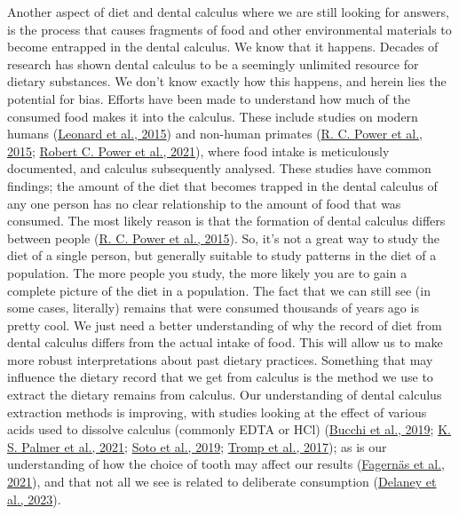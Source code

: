 \documentclass[
  letterpaper,
]{book}
\begin{document}
Another aspect of diet and dental calculus where we are still looking
for answers, is the process that causes fragments of food and other
environmental materials to become entrapped in the dental calculus. We
know that it happens. Decades of research has shown dental calculus to
be a seemingly unlimited resource for dietary substances. We don't know
exactly how this happens, and herein lies the potential for bias.
Efforts have been made to understand how much of the consumed food makes
it into the calculus. These include studies on modern humans
(\protect\hyperlink{ref-leonardPlantMicroremains2015}{Leonard et al.,
2015}) and non-human primates
(\protect\hyperlink{ref-powerChimpCalculus2015}{R. C. Power et al.,
2015}; \protect\hyperlink{ref-powerRepresentativenessDental2021}{Robert
C. Power et al., 2021}), where food intake is meticulously documented,
and calculus subsequently analysed. These studies have common findings;
the amount of the diet that becomes trapped in the dental calculus of
any one person has no clear relationship to the amount of food that was
consumed. The most likely reason is that the formation of dental
calculus differs between people
(\protect\hyperlink{ref-powerChimpCalculus2015}{R. C. Power et al.,
2015}). So, it's not a great way to study the diet of a single person,
but generally suitable to study patterns in the diet of a population.
The more people you study, the more likely you are to gain a complete
picture of the diet in a population. The fact that we can still see (in
some cases, literally) remains that were consumed thousands of years ago
is pretty cool. We just need a better understanding of why the record of
diet from dental calculus differs from the actual intake of food. This
will allow us to make more robust interpretations about past dietary
practices. Something that may influence the dietary record that we get
from calculus is the method we use to extract the dietary remains from
calculus. Our understanding of dental calculus extraction methods is
improving, with studies looking at the effect of various acids used to
dissolve calculus (commonly EDTA or HCl)
(\protect\hyperlink{ref-bucchiComparisonsMethods2019}{Bucchi et al.,
2019}; \protect\hyperlink{ref-palmerComparingUse2021}{K. S. Palmer et
al., 2021};
\protect\hyperlink{ref-sotoCharacterizationDecontamination2019}{Soto et
al., 2019}; \protect\hyperlink{ref-trompEDTACalculus2017}{Tromp et al.,
2017}); as is our understanding of how the choice of tooth may affect
our results
(\protect\hyperlink{ref-fagernasMicrobialBiogeography2021}{Fagernäs et
al., 2021}), and that not all we see is related to deliberate
consumption (\protect\hyperlink{ref-delaneyMoreWhat2023}{Delaney et al.,
2023}).
\end{document}
